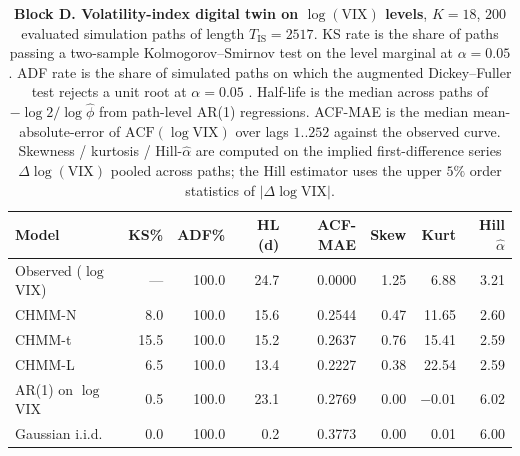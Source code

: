 \begin{table}[ht]
\centering
\small
\caption{\textbf{Block D. Volatility-index digital twin on $\log(\text{VIX})$ levels}, $K = 18$, $200$ evaluated simulation paths of length $T_{\text{IS}} = 2517$. KS rate is the share of paths passing a two-sample Kolmogorov--Smirnov test on the level marginal at $\alpha = 0.05$. ADF rate is the share of simulated paths on which the augmented Dickey--Fuller test rejects a unit root at $\alpha = 0.05$ \cite{mackinnon1996numerical}. Half-life is the median across paths of $-\log 2 / \log\hat\phi$ from path-level AR(1) regressions. ACF-MAE is the median mean-absolute-error of $\mathrm{ACF}(\log\text{VIX})$ over lags $1..252$ against the observed curve. Skewness / kurtosis / Hill-$\hat\alpha$ are computed on the implied first-difference series $\Delta \log(\text{VIX})$ pooled across paths; the Hill estimator uses the upper $5\%$ order statistics of $|\Delta\log\text{VIX}|$.}
\label{tab:block_d}
\begin{tabular}{lrrrrrrr}
\toprule
Model & KS\% & ADF\% & HL (d) & ACF-MAE & Skew & Kurt & Hill $\hat\alpha$ \\
\midrule
Observed ($\log$VIX)    & ---   & 100.0 & 24.7 & 0.0000 & 1.25 & 6.88 & 3.21 \\
\midrule
CHMM-N                  &  8.0  & 100.0 & 15.6 & 0.2544 & 0.47 & 11.65 & 2.60 \\
CHMM-t                  & 15.5  & 100.0 & 15.2 & 0.2637 & 0.76 & 15.41 & 2.59 \\
CHMM-L                  &  6.5  & 100.0 & 13.4 & 0.2227 & 0.38 & 22.54 & 2.59 \\
\midrule
AR(1) on $\log$VIX      &  0.5  & 100.0 & 23.1 & 0.2769 &  0.00 & $-0.01$ & 6.02 \\
Gaussian i.i.d.         &  0.0  & 100.0 &  0.2 & 0.3773 &  0.00 &  0.01  & 6.00 \\
\bottomrule
\end{tabular}
\end{table}

